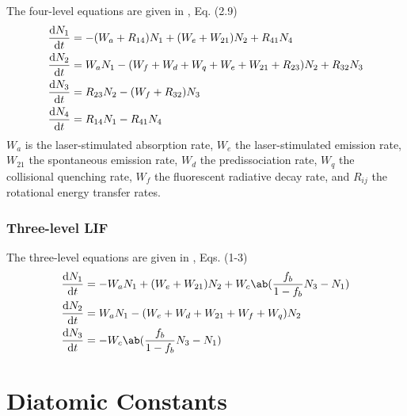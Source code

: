 \documentclass[11pt, twoside, fleqn]{report}
\begin{document}
The four-level equations are given in \cite{grinsteadTemperatureMeasurementHighTemperature1995}, Eq. (2.9)
\begin{align*}
    \odv{N_1}{t} & = -(W_a + R_{14})N_1 + (W_e + W_{21})N_2 + R_{41}N_4                      \\
    \odv{N_2}{t} & = W_aN_1 - (W_f + W_d + W_q + W_e + W_{21} + R_{23})N_2 + R_{32}N_3 \\
    \odv{N_3}{t} & = R_{23}N_2 - (W_f + R_{32})N_3                                               \\
    \odv{N_4}{t} & = R_{14}N_1 - R_{41}N_4
\end{align*}
$W_a$ is the laser-stimulated absorption rate, $W_e$ the laser-stimulated emission rate, $W_{21}$ the spontaneous emission rate, $W_d$ the predissociation rate, $W_q$ the collisional quenching rate, $W_f$ the fluorescent radiative decay rate, and $R_{ij}$ the rotational energy transfer rates.

\subsection{Three-level LIF}

The three-level equations are given in \cite{diskin3LevelModelSchumann1996}, Eqs. (1-3)
\begin{align*}
    \odv{N_1}{t} & = -W_aN_1 + (W_e + W_{21})N_2 + W_c\ab(\frac{f_b}{1 - f_b}N_3 - N_1) \\
    \odv{N_2}{t} & = W_aN_1 - (W_e + W_d + W_{21} + W_f + W_q)N_2                           \\
    \odv{N_3}{t} & = -W_c\ab(\frac{f_b}{1 - f_b}N_3 - N_1)
\end{align*}

\appendix
\chapter{Diatomic Constants}
\label{a:diatomic_constants}
\end{document}
